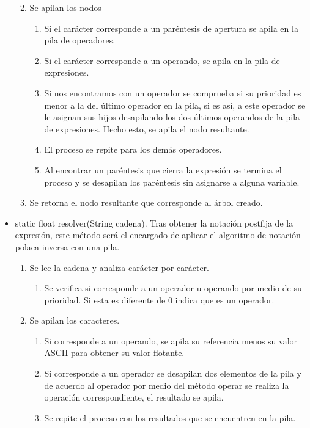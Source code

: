 \documentclass{article}
\begin{document}
\begin{itemize}
\begin{enumerate}
\begin{enumerate}
\end{enumerate}
\item Se apilan los nodos
\begin{enumerate}
\item Si el carácter corresponde a un paréntesis de apertura se apila en la pila de operadores.
\item Si el carácter corresponde a un operando, se apila en la pila de expresiones.
\item Si nos encontramos con un operador se comprueba si su prioridad es menor a la del último operador en la pila, si es así, a este operador se le asignan sus hijos desapilando los dos últimos operandos de la pila de expresiones. Hecho esto, se apila el nodo resultante.
\item El proceso se repite para los demás operadores.
\item Al encontrar un paréntesis que cierra la expresión se termina el proceso y se desapilan los paréntesis sin asignarse a alguna variable.
\end{enumerate}
\item Se retorna el nodo resultante que corresponde al árbol creado.
\end{enumerate}
\item static float resolver(String cadena). Tras obtener la notación postfija de la expresión, este método será el encargado de aplicar el algoritmo de notación polaca inversa con una pila.
\begin{enumerate}
\item Se lee la cadena y analiza carácter por carácter.
\begin{enumerate}
\item Se verifica si corresponde a un operador u operando por medio de su prioridad. Si esta es diferente de 0 indica que es un operador.
\end{enumerate}
\item Se apilan los caracteres.
\begin{enumerate}
\item Si corresponde a un operando, se apila su referencia menos su valor ASCII para obtener su valor flotante.
\item Si corresponde a un operador se desapilan dos elementos de la pila y de acuerdo al operador por medio del método operar se realiza la operación correspondiente, el resultado se apila.
\item Se repite el proceso con los resultados que se encuentren en la pila.
\end{enumerate}

\end{enumerate}
\end{itemize}
\end{document}
